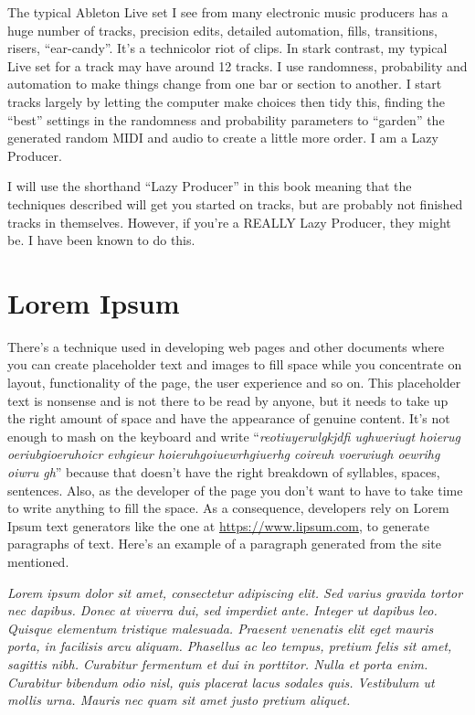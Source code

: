 \documentclass[
  12pt,
  letterpaper,
  oneside,
  open=any]{scrbook}
\begin{document}
The typical Ableton Live set I see from many electronic music producers
has a huge number of tracks, precision edits, detailed automation,
fills, transitions, risers, ``ear-candy''. It's a technicolor riot of
clips. In stark contrast, my typical Live set for a track may have
around 12 tracks. I use randomness, probability and automation to make
things change from one bar or section to another. I start tracks largely
by letting the computer make choices then tidy this, finding the
``best'' settings in the randomness and probability parameters to
``garden'' the generated random MIDI and audio to create a little more
order. I am a Lazy Producer.

I will use the shorthand ``Lazy Producer'' in this book meaning that the
techniques described will get you started on tracks, but are probably
not finished tracks in themselves. However, if you're a REALLY Lazy
Producer, they might be. I have been known to do this.

\section*{Lorem Ipsum}\label{lorem-ipsum}


There's a technique used in developing web pages and other documents
where you can create placeholder text and images to fill space while you
concentrate on layout, functionality of the page, the user experience
and so on. This placeholder text is nonsense and is not there to be read
by anyone, but it needs to take up the right amount of space and have
the appearance of genuine content. It's not enough to mash on the
keyboard and write ``\emph{reotiuyerwlgkjdfi ughweriugt hoierug
oeriubgioeruhoicr evhgieur hoieruhgoiuewrhgiuerhg coireuh voerwiugh
oewrihg oiwru gh}'' because that doesn't have the right breakdown of
syllables, spaces, sentences. Also, as the developer of the page you
don't want to have to take time to write anything to fill the space. As
a consequence, developers rely on Lorem Ipsum text generators like the
one at \url{https://www.lipsum.com}, to generate paragraphs of text.
Here's an example of a paragraph generated from the site mentioned.

\emph{Lorem ipsum dolor sit amet, consectetur adipiscing elit. Sed
varius gravida tortor nec dapibus. Donec at viverra dui, sed imperdiet
ante. Integer ut dapibus leo. Quisque elementum tristique malesuada.
Praesent venenatis elit eget mauris porta, in facilisis arcu aliquam.
Phasellus ac leo tempus, pretium felis sit amet, sagittis nibh.
Curabitur fermentum et dui in porttitor. Nulla et porta enim. Curabitur
bibendum odio nisl, quis placerat lacus sodales quis. Vestibulum ut
mollis urna. Mauris nec quam sit amet justo pretium aliquet.}
\end{document}
